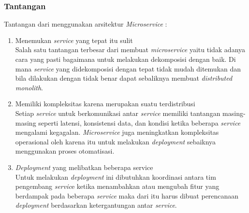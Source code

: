 \subsubsection{Tantangan}
Tantangan dari menggunakan arsitektur \textit{Microservice}  \cite{ECD,74C,1C7}:
\begin{enumerate}[leftmargin=1.3cm]
	\item Menemukan \textit{service} yang tepat itu sulit\\
	Salah satu tantangan terbesar dari membuat \textit{microservice} yaitu tidak adanya cara yang pasti bagaimana untuk melakukan dekomposisi dengan baik. Di mana \textit{service} yang didekomposisi dengan tepat tidak mudah ditemukan dan bila dilakukan dengan tidak benar dapat sebaliknya membuat \textit{distributed monolith}. 
	\item Memiliki kompleksitas karena merupakan suatu terdistribusi\\
	Setiap \textit{service} untuk berkomunikasi antar \textit{service} memiliki tantangan masing-masing seperti latensi, konsistensi data, dan kondisi ketika beberapa \textit{service} mengalami kegagalan. \textit{Microservice} juga meningkatkan kompleksitas operasional oleh karena itu untuk melakukan \textit{deployment} sebaiknya menggunakan proses otomatisasi.
	\item \textit{Deployment} yang melibatkan beberapa service\\
	Untuk melakukan \textit{deployment} ini dibutuhkan koordinasi antara tim pengembang \textit{servic}e ketika menambahkan atau mengubah fitur yang berdampak pada beberapa \textit{service} maka dari itu harus dibuat perencanaan \textit{deployment} berdasarkan ketergantungan antar \textit{service}.
\end{enumerate}	

